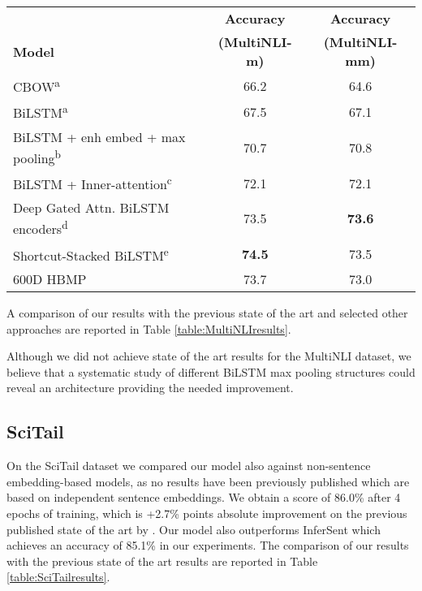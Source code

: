\documentclass{nle}
\begin{document}
\begin{table*}[t]
\begin{small}
\begin{center}
\begin{tabular}{l c c}
\hline
\bf  & \bf Accuracy  & \bf Accuracy  \\
\bf Model & \bf  (MultiNLI-m) & \bf (MultiNLI-mm) \\ \hline
CBOW\textsuperscript{a} & 66.2 & 64.6 \\
BiLSTM\textsuperscript{a} & 67.5 & 67.1 \\
BiLSTM + enh embed + max pooling\textsuperscript{b} & 70.7 & 70.8 \\
BiLSTM + Inner-attention\textsuperscript{c} & 72.1 & 72.1 \\
Deep Gated Attn. BiLSTM encoders\textsuperscript{d} & 73.5 & \bf 73.6 \\
Shortcut-Stacked BiLSTM\textsuperscript{e} & \bf 74.5 & 73.5 \\
\hline
600D HBMP & 73.7 & 73.0 \\
\hline
\end{tabular}
\end{center}
\end{small}
\caption{\label{table:MultiNLIresults} MultiNLI test accuracies (\%). Results marked with \textsuperscript{a} are baseline results by \cite{multinli}, \textsuperscript{b} by \cite{Vu:repeval}, \textsuperscript{c} by \cite{Balazs:repeval}, \textsuperscript{d} by \cite{chen:repeval} and \textsuperscript{e} by \cite{Nie:repeval}. Our results for the MultiNLI test sets were obtained by submitting the predictions to the respective Kaggle competitions.}
\end{table*}

A comparison of our results with the previous state of the art and selected other approaches are reported in Table \ref{table:MultiNLIresults}.

Although we did not achieve state of the art results for the MultiNLI dataset, we believe that a systematic study of different BiLSTM max pooling structures could reveal an architecture providing the needed improvement.

\subsection{SciTail}
\label{sec:ResultsSciTail}
On the SciTail dataset we compared our model also against non-sentence embedding-based models, as no results have been previously published which are based on independent sentence embeddings.
We obtain a score of 86.0\% after 4 epochs of training, which is +2.7\% points absolute improvement on the previous published state of the art by \cite{cafe}. Our model also outperforms InferSent which achieves an accuracy of 85.1\% in our experiments. The comparison of our results with the previous state of the art results are reported in Table \ref{table:SciTailresults}.
\end{document}
